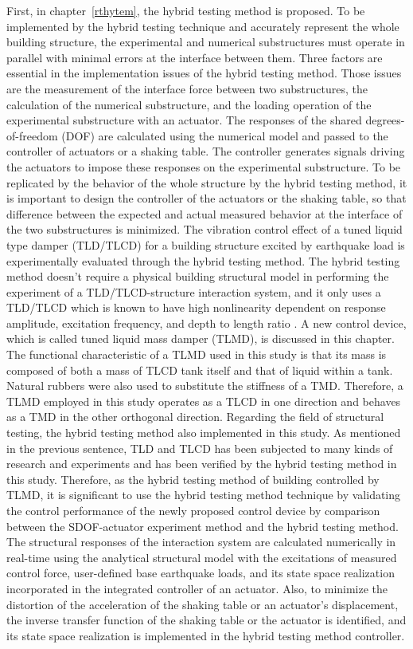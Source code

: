 First, in chapter~\ref{rthytem}, the hybrid testing method is proposed. To be implemented by the hybrid testing technique and accurately represent the whole building structure, the experimental and numerical substructures must operate in parallel with minimal errors at the interface between them. Three factors are essential in the implementation issues of the hybrid testing method. Those issues are the measurement of the interface force between two substructures, the calculation of the numerical substructure, and the loading operation of the experimental substructure with an actuator. The responses of the shared degrees-of-freedom (DOF) are calculated using the numerical model and passed to the controller of actuators or a shaking table. The controller generates signals driving the actuators to impose these responses on the experimental substructure. To be replicated by the behavior of the whole structure by the hybrid testing method, it is important to design the controller of the actuators or the shaking table, so that difference between the expected and actual measured behavior at the interface of the two substructures is minimized. The vibration control effect of a tuned liquid type damper (TLD/TLCD) for a building structure excited by earthquake load is experimentally evaluated through the hybrid testing method. The hybrid testing method doesn’t require a physical building structural model in performing the experiment of a TLD/TLCD-structure interaction system, and it only uses a TLD/TLCD which is known to have high nonlinearity dependent on response amplitude, excitation frequency, and depth to length ratio \citep{yalla2001liquid}. A new control device, which is called tuned liquid mass damper (TLMD), is discussed in this chapter. The functional characteristic of a TLMD used in this study is that its mass is composed of both a mass of TLCD tank itself and that of liquid within a tank. Natural rubbers were also used to substitute the stiffness of a TMD. Therefore, a TLMD employed in this study operates as a TLCD in one direction and behaves as a TMD in the other orthogonal direction. Regarding the field of structural testing, the hybrid testing method also implemented in this study. As mentioned in the previous sentence, TLD and TLCD has been subjected to many kinds of research and experiments and has been verified by the hybrid testing method in this study. Therefore, as the hybrid testing method of building controlled by TLMD, it is significant to use the hybrid testing method technique by validating the control performance of the newly proposed control device by comparison between the SDOF-actuator experiment method and the hybrid testing method. 
The structural responses of the interaction system are calculated numerically in real-time using the analytical structural model with the excitations of measured control force, user-defined base earthquake loads, and its state space realization incorporated in the integrated controller of an actuator. Also, to minimize the distortion of the acceleration of the shaking table or an actuator's displacement, the inverse transfer function of the shaking table or the actuator is identified, and its state space realization is implemented in the hybrid testing method controller.

